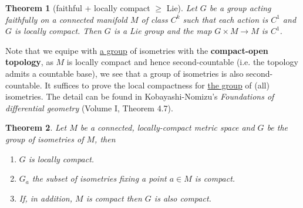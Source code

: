 \documentclass[11pt]{article}
\newtheorem{theorem}{Theorem}
\begin{document}
\begin{theorem}[faithful + locally compact $\geq$ Lie]
\label{org98ebf20}
Let \(G\) be a group acting faithfully on a connected manifold \(M\) of class \(C^k\) such that each
action is \(C^1\) and \(G\) is locally compact. Then \(G\) is a Lie group and the map \(G\times M\longrightarrow M\) is \(C^1\).
\end{theorem}

Note that we equipe with \uline{a group} of isometries with the \textbf{compact-open topology},
 as \(M\) is locally compact and hence second-countable (i.e. the topology admits a countable
base), we see that a group of isometries is also second-countable. It suffices to prove the
local compactness for \uline{the group} of (all) isometries. The detail can be found in
Kobayashi-Nomizu's \emph{Foundations of differential geometry} (Volume I, Theorem 4.7).

\begin{theorem}
\label{org3c9a7d1}
Let \(M\) be a connected, locally-compact metric space and \(G\) be the group of isometries of
\(M\), then
\begin{enumerate}
\item \(G\) is locally compact.
\item \(G_a\) the subset of isometries fixing a point \(a\in M\) is compact.
\item If, in addition, \(M\) is compact then \(G\) is also compact.
\end{enumerate}
\end{theorem}
\end{document}
